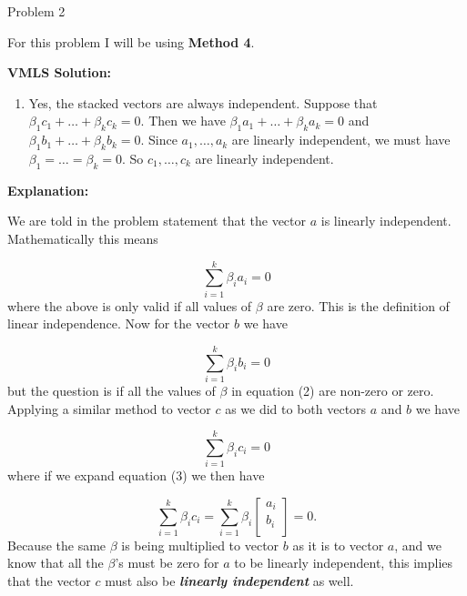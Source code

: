 \begin{problem}{Problem 2}
    \begin{highlight}
        For this problem I will be using \textbf{Method 4}. \vspace*{1em}

        \textbf{VMLS Solution:}

        \begin{enumerate}[label = (\alph*)]
            \item Yes, the stacked vectors are always independent. Suppose that $\beta_{1} c_{1} + \dots + \beta_{k} c_{k} = 0$. Then we have $\beta_{1}a_{1} + \dots + \beta_{k} a_{k} = 0$ and $\beta_{1} 
            b_{1} + \dots + \beta_{k} b_{k} = 0$. Since $a_{1} , \dots , a_{k}$ are linearly independent, we must have $\beta_{1} = \dots = \beta_{k} = 0$. So $c_{1}, \dots , c_{k}$ are linearly 
            independent.
        \end{enumerate}

        \textbf{Explanation:} \vspace*{1em}

        We are told in the problem statement that the vector $a$ is linearly independent. Mathematically this means

        \setcounter{equation}{0}
        \begin{equation}
            \sum_{i = 1}^{k} \beta_{i}a_{i} = 0
        \end{equation}
        where the above is only valid if all values of $\beta$ are zero. This is the definition of linear independence. Now for the vector $b$ we have

        \begin{equation}
            \sum_{i = 1}^{k} \beta_{i}b_{i} = 0
        \end{equation}
        but the question is if all the values of $\beta$ in equation (2) are non-zero or zero. Applying a similar method to vector $c$ as we did to both vectors $a$ and $b$ we have

        \begin{equation}
            \sum_{i = 1}^{k} \beta_{i}c_{i} = 0
        \end{equation}
        where if we expand equation (3) we then have 

        \begin{equation}
            \sum_{i = 1}^{k} \beta_{i}c_{i} = \sum_{i = 1}^{k} \beta_{i}
            \begin{bmatrix}
                a_{i} \\
                b_{i} \\
            \end{bmatrix}
            = 0.
        \end{equation}
        Because the same $\beta$ is being multiplied to vector $b$ as it is to vector $a$, and we know that all the $\beta$'s must be zero for $a$ to be linearly independent, this implies that the 
        vector $c$ must also be \textit{\textbf{linearly independent}} as well.
    \end{highlight}


\end{problem}
